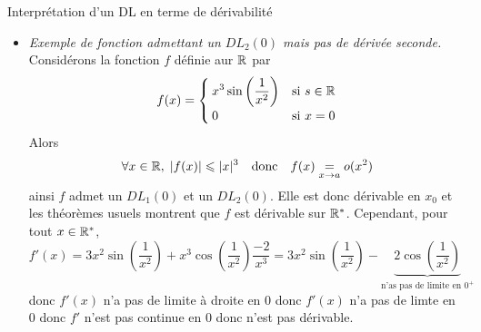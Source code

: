 \documentclass{article}
\begin{document}
\begin{question_kholle}{Interprétation d’un DL en terme de dérivabilité}
\begin{itemize}[label=$\vartriangleright$]
\begin{description}
			      \item[$(\impliedby)$] Réciproquement, si $f$ est dérivable en $x_{0}$, alors $f$ admet comme $DL_{1}(x_{0})$ son approximation au premier ordre, à savoir
			            \[
				            f(x)\underset{x \rightarrow a}{=} f(x_{0})+f'(x_{0})(x-x_{0})+o(x-x_{0})
			            \]
			            La preuve consiste à poser l’application
			            \[
				            \varepsilon \left|\applic{I}{\R}{x}{\begin{cases}
						            \frac{f(x)-f(x_{0}) - f'(x_{0})(x-x_{0})}{x-x_{0}} & \text{si $x\in I\setminus\{x_{0}\}$} \\
						            0                                                  & \text{si $x=x_{0}$}
					            \end{cases}}\right.
			            \]
			            puis à montrer dans un premier temps que cette application convient, et dans un second temps à écrire $|\varepsilon(x)|$ comme la distance entre le taux d’accroissement en $x_{0}$ de $f$ et $f'(x_{0})$, pour pouvoir conclure en utilisant la définition de la dérivabilité de $f$ en $x_{0}$ (limite de son taux d’accroissement) quand à la convergence vers 0 de $\varepsilon$.
		      \end{description}
		\item \textit{Exemple de fonction admettant un $DL_{2}(0)$ mais pas de dérivée seconde.}\\
		      Considérons la fonction $f$ définie aur $\mathbb R$ par
		      \[
			      f(x)=\begin{cases}
				      \displaystyle x^{3}\sin \left(\frac{1}{x^{2}}\right) & \text{si $s\in\mathbb R$} \\
				      0                                                    & \text{si $x=0$}
			      \end{cases}
		      \]
		      Alors
		      \[
			      \forall x\in\mathbb R,\;|f(x)|\leqslant |x|^{3} \quad\text{donc}\quad f(x)\underset{x \rightarrow a}{=} o(x^{2})
		      \]
		      ainsi $f$ admet un $DL_{1}(0)$ et un $DL_{2}(0)$. Elle est donc dérivable en $x_{0}$ et les théorèmes usuels montrent que $f$ est dérivable sur $\mathbb R^{*}$. Cependant, pour tout $x\in\mathbb R^{*}$,
		      \[
			      f'(x)=3x^{2}\sin \left(\frac{1}{x^{2}}\right) + x^{3}\cos \left(\frac{1}{x^{2}}\right)\frac{-2}{x^{3}} = 3x^{2}\sin \left(\frac{1}{x^{2}}\right) -\underbrace{2\cos \left(\frac{1}{x^{2}}\right)}_{\text{n’as pas de limite en $0^{+}$}}
		      \]
		      donc $f'(x)$ n’a pas de limite à droite en 0 donc $f'(x)$ n’a pas de limte en 0 donc $f'$ n’est pas continue en 0 donc n’est pas dérivable.
	\end{itemize}
\end{question_kholle}
\end{document}
